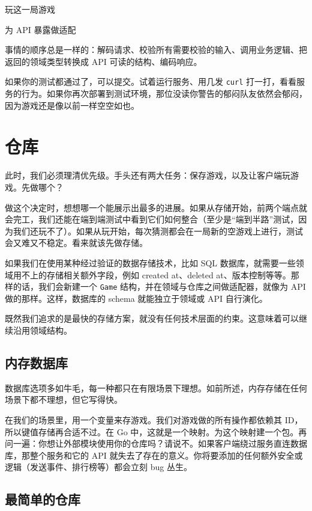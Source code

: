 \begin{codeannotations}
\item 玩这一局游戏
\item 为 API 暴露做适配
\end{codeannotations}

事情的顺序总是一样的：解码请求、校验所有需要校验的输入、调用业务逻辑、把返回的领域类型转换成 API 可读的结构、编码响应。

如果你的测试都通过了，可以提交。试着运行服务、用几发 \texttt{curl} 打一打，看看服务的行为。如果你再次部署到测试环境，那位没读你警告的郁闷队友依然会郁闷，因为游戏还是像以前一样空空如也。

\section{仓库}

此时，我们必须理清优先级。手头还有两大任务：保存游戏，以及让客户端玩游戏。先做哪个？

做这个决定时，想想哪一个能展示出最多的进展。如果从存储开始，前两个端点就会完工，我们还能在端到端测试中看到它们如何整合（至少是``端到半路''测试，因为我们还玩不了）。如果从玩开始，每次猜测都会在一局新的空游戏上进行，测试会又难又不稳定。看来就该先做存储。

如果我们在使用某种经过验证的数据存储技术，比如 SQL 数据库，就需要一些领域用不上的存储相关额外字段，例如 created at、deleted at、版本控制等等。那样的话，我们会新建一个 \texttt{Game} 结构，并在领域与仓库之间做适配器，就像为 API 做的那样。这样，数据库的 schema 就能独立于领域或 API 自行演化。

既然我们追求的是最快的存储方案，就没有任何技术层面的约束。这意味着可以继续沿用领域结构。

\subsection{内存数据库}

数据库选项多如牛毛，每一种都只在有限场景下理想。如前所述，内存存储在任何场景下都不理想，但它写得快。

在我们的场景里，用一个变量来存游戏。我们对游戏做的所有操作都依赖其 ID，所以键值存储再合适不过。在 Go 中，这就是一个映射。为这个映射建一个包。再问一遍：你想让外部模块使用你的仓库吗？请说不。如果客户端绕过服务直连数据库，那整个服务和它的 API 就失去了存在的意义。你将要添加的任何额外安全或逻辑（发送事件、排行榜等）都会立刻 bug 丛生。

\subsection{最简单的仓库}

